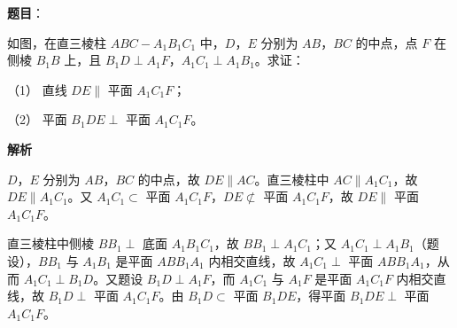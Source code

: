 \begin{answer}

\textbf{题目}：

如图，在直三棱柱 \(ABC-A_{1}B_{1}C_{1}\) 中，\(D\)，\(E\) 分别为 \(AB\)，\(BC\) 的中点，点 \(F\) 在侧棱 \(B_{1}B\) 上，且 \(B_{1}D\perp A_{1}F\)，\(A_{1}C_{1}\perp A_{1}B_{1}\)。求证：

（1） 直线 \(DE\parallel\) 平面 \(A_{1}C_{1}F\)；

（2） 平面 \(B_{1}DE\perp\) 平面 \(A_{1}C_{1}F\)。
\nopagebreak[4]
\begin{center}\end{center}
\nopagebreak[4]
\textbf{解析}


\(D\)，\(E\) 分别为 \(AB\)，\(BC\) 的中点，故 \(DE\parallel AC\)。直三棱柱中 \(AC\parallel A_{1}C_{1}\)，故 \(DE\parallel A_{1}C_{1}\)。又 \(A_{1}C_{1}\subset\) 平面 \(A_{1}C_{1}F\)，\(DE\not\subset\) 平面 \(A_{1}C_{1}F\)，故 \(DE\parallel\) 平面 \(A_{1}C_{1}F\)。


直三棱柱中侧棱 \(BB_{1}\perp\) 底面 \(A_{1}B_{1}C_{1}\)，故 \(BB_{1}\perp A_{1}C_{1}\)；又 \(A_{1}C_{1}\perp A_{1}B_{1}\)（题设），\(BB_{1}\) 与 \(A_{1}B_{1}\) 是平面 \(ABB_{1}A_{1}\) 内相交直线，故 \(A_{1}C_{1}\perp\) 平面 \(ABB_{1}A_{1}\)，从而 \(A_{1}C_{1}\perp B_{1}D\)。又题设 \(B_{1}D\perp A_{1}F\)，而 \(A_{1}C_{1}\) 与 \(A_{1}F\) 是平面 \(A_{1}C_{1}F\) 内相交直线，故 \(B_{1}D\perp\) 平面 \(A_{1}C_{1}F\)。由 \(B_{1}D\subset\) 平面 \(B_{1}DE\)，得平面 \(B_{1}DE\perp\) 平面 \(A_{1}C_{1}F\)。



\end{answer}
